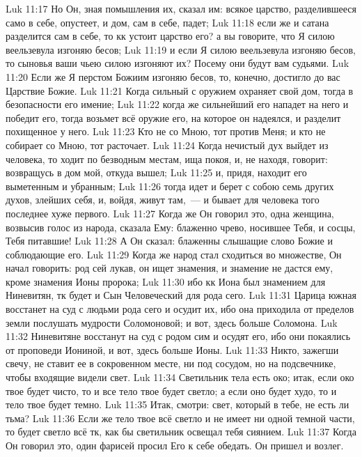 \vs Luk 11:17 Но Он, зная помышления их, сказал им: всякое царство, разделившееся само в себе, опустеет, и дом,  сам в себе, падет;
\vs Luk 11:18 если же и сатана разделится сам в себе, то кк устоит царство его? а вы говорите, что Я силою веельзевула изгоняю бесов;
\vs Luk 11:19 и если Я силою веельзевула изгоняю бесов, то сыновья ваши чьею силою изгоняют их? Посему они будут вам судьями.
\vs Luk 11:20 Если же Я перстом Божиим изгоняю бесов, то, конечно, достигло до вас Царствие Божие.
\vs Luk 11:21 Когда сильный с оружием охраняет свой дом, тогда в безопасности его имение;
\vs Luk 11:22 когда же сильнейший его нападет на него и победит его, тогда возьмет всё оружие его, на которое он надеялся, и разделит похищенное у него.
\vs Luk 11:23 Кто не со Мною, тот против Меня; и кто не собирает со Мною, тот расточает.
\vs Luk 11:24 Когда нечистый дух выйдет из человека, то ходит по безводным местам, ища покоя, и, не находя, говорит: возвращусь в дом мой, откуда вышел;
\vs Luk 11:25 и, придя, находит его выметенным и убранным;
\vs Luk 11:26 тогда идет и берет с собою семь других духов, злейших себя, и, войдя, живут там,~--- и бывает для человека того последнее хуже первого.
\vs Luk 11:27 Когда же Он говорил это, одна женщина, возвысив голос из народа, сказала Ему: блаженно чрево, носившее Тебя, и сосцы, Тебя питавшие!
\vs Luk 11:28 А Он сказал: блаженны слышащие слово Божие и соблюдающие его.
\rsbpar\vs Luk 11:29 Когда же народ стал сходиться во множестве, Он начал говорить: род сей лукав, он ищет знамения, и знамение не дастся ему, кроме знамения Ионы пророка;
\vs Luk 11:30 ибо кк Иона был знамением для Ниневитян, тк будет и Сын Человеческий для рода сего.
\vs Luk 11:31 Царица южная восстанет на суд с людьми рода сего и осудит их, ибо она приходила от пределов земли послушать мудрости Соломоновой; и вот, здесь больше Соломона.
\vs Luk 11:32 Ниневитяне восстанут на суд с родом сим и осудят его, ибо они покаялись от проповеди Иониной, и вот, здесь больше Ионы.
\rsbpar\vs Luk 11:33 Никто, зажегши свечу, не ставит ее в сокровенном месте, ни под сосудом, но на подсвечнике, чтобы входящие видели свет.
\vs Luk 11:34 Светильник тела есть око; итак, если око твое будет чисто, то и все тело твое будет светло; а если оно будет худо, то и тело твое будет темно.
\vs Luk 11:35 Итак, смотри: свет, который в тебе, не есть ли тьма?
\vs Luk 11:36 Если же тело твое всё светло и не имеет ни одной темной части, то будет светло всё тк, как бы светильник освещал тебя сиянием.
\rsbpar\vs Luk 11:37 Когда Он говорил это, один фарисей просил Его к себе обедать. Он пришел и возлег.
